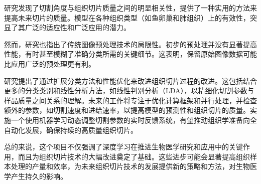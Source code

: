 研究发现了切割角度与组织切片质量之间的明显相关性，提供了一种实用的方法来提高未来切片的质量。模型在各种组织类型（如鱼卵巢和肺组织）上的有效性，突显了其广泛的适应性和广泛应用的潜力。

然而，研究也指出了传统图像预处理技术的局限性。初步的预处理并没有显著提高性能，有时甚至模糊了准确分类所需的关键细节。这表明，保留原始图像数据可能比应用广泛的预处理更有利。

研究提出了通过扩展分类方法和性能优化来改进组织切片过程的改进。这包括结合更多的分类类别和线性分析方法，如线性判别分析（LDA），以精细化切割参数与样品质量之间关系的理解。未来的工作将专注于优化计算框架和并行处理，并检查额外的参数，如切割速度和进给速率，以提高模型的预测性和组织切片的质量。实施一个使用机器学习动态调整切割参数的实时反馈系统，有望推动组织学准备向全自动化发展，确保持续的高质量组织切片。

总的来说，这个项目不仅强调了深度学习在推进生物医学研究和应用中的关键作用，而且为组织切片技术的大幅改进奠定了基础。这些进步可能会显著提高组织样本处理的产量和效率，为未来组织切片技术的发展提供新的策略和方法，对生物医学产生持久的影响。



\FloatBarrier %